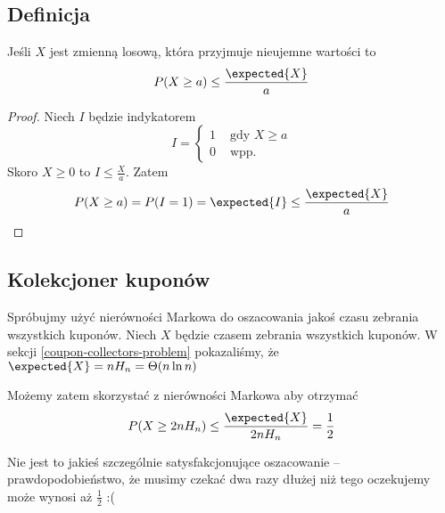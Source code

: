 \subsection{Definicja}
\begin{theorem}
    Jeśli \( X \) jest zmienną losową, która przyjmuje nieujemne wartości to
    \[
        P(X \geq a) \leq \frac{\expected{X}}{a}
    \]
\end{theorem}
\begin{proof}
    Niech \( I \) będzie indykatorem
    \[
        I = \begin{cases}
            1 & \text{ gdy } X \geq a \\
            0 & \text{ wpp. }
        \end{cases}
    \]
    Skoro \( X \geq 0 \) to \( I \leq \frac{X}{a} \).
    Zatem
    \[
        P(X \geq a) = P(I = 1) = \expected{I} \leq \frac{\expected{X}}{a}
    \]
\end{proof}

\subsection{Kolekcjoner kuponów}
Spróbujmy użyć nierówności Markowa do oszacowania jakoś czasu zebrania wszystkich kuponów.
Niech \( X \) będzie czasem zebrania wszystkich kuponów.
W sekcji \ref{coupon-collectors-problem} pokazaliśmy, że \( \expected{X} = nH_n = \Theta(n \ln n) \)

Możemy zatem skorzystać z nierówności Markowa aby otrzymać
\[
    P(X \geq 2n H_n) \leq \frac{\expected{X}}{2n H_n} = \frac{1}{2}
\]

Nie jest to jakieś szczególnie satysfakcjonujące oszacowanie -- prawdopodobieństwo, że musimy czekać dwa
razy dłużej niż tego oczekujemy może wynosi aż \( \frac{1}{2} \) :(